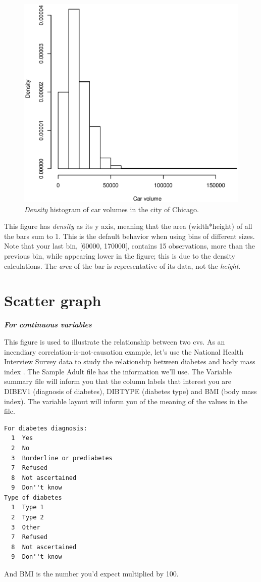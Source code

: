 \documentclass{report}
\newcommand{\notefor}[1]{\hfill\textbf{\textit{#1}}}
\begin{document}
	\begin{figure}[h]
		\centering
		\includegraphics[width=1.0\textwidth]{histd.eps}
		\caption{\emph{Density} histogram of car volumes in the city of Chicago.}
		\label{fig:histd}
	\end{figure}

	This figure has \emph{density} as its y axis, meaning that the area (width*height) of all the bars sum to 1. This is the default behavior when using bins of different sizes. Note that your last bin, [60000, 170000[, contains 15 observations, more than the previous bin, while appearing lower in the figure; this is due to the density calculations. The \emph{area} of the bar is representative of its data, not the \emph{height}.
	
	\section{Scatter graph}
	\notefor{For continuous variables}
	
	This figure is used to illustrate the relationship between two \glspl{cv}. As an incendiary correlation-is-not-causation example, let's use the National Health Interview Survey data to study the relationship between diabetes and body mass index \cite{nhis}. The Sample Adult file has the information we'll use. The Variable summary file will inform you that the column labels that interest you are DIBEV1 (diagnosis of diabetes), DIBTYPE (diabetes type) and BMI (body mass index). The variable layout will inform you of the meaning of the values in the file.
	\begin{verbatim}
For diabetes diagnosis: 
  1  Yes
  2  No
  3  Borderline or prediabetes
  7  Refused
  8  Not ascertained
  9  Don''t know 
Type of diabetes
  1  Type 1
  2  Type 2
  3  Other
  7  Refused
  8  Not ascertained
  9  Don''t know 
\end{verbatim}
	And BMI is the number you'd expect multiplied by 100.
	
\end{document}
